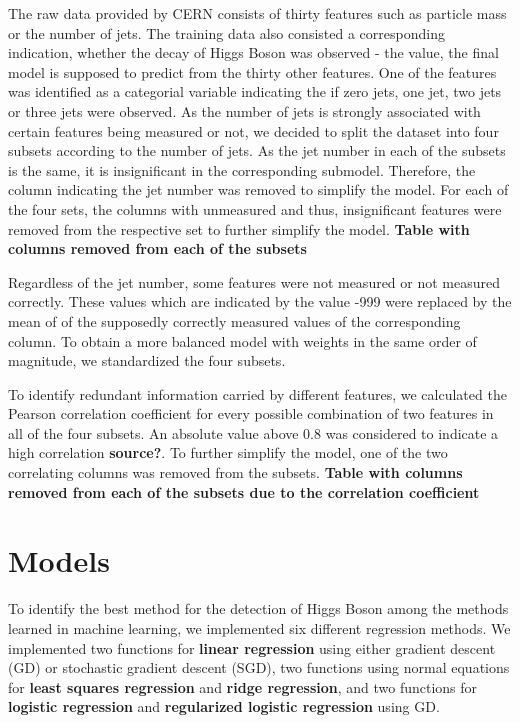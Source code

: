 \documentclass[10pt,conference,compsocconf]{IEEEtran}
\begin{document}
The raw data provided by CERN consists of thirty features such as particle mass or the number of jets. The training data also consisted a corresponding indication, whether the decay of Higgs Boson was observed - the value, the final model is supposed to predict from the thirty other features. One of the features was identified as a categorial variable indicating the if zero jets, one jet, two jets or three jets were observed. As the number of jets is strongly associated with certain features being measured or not, we decided to split the dataset into four subsets according to the number of jets. As the jet number in each of the subsets is the same, it is insignificant in the corresponding submodel. Therefore, the column indicating the jet number was removed to simplify the model. For each of the four sets, the columns with unmeasured and thus, insignificant features were removed from the respective set to further simplify the model.
\textbf{Table with columns removed from each of the subsets}

Regardless of the jet number, some features were not measured or not measured correctly. These values which are indicated by the value -999 were replaced by the mean of of the supposedly correctly measured values of the corresponding column. To obtain a more balanced model with weights in the same order of magnitude, we standardized the four subsets. 

To identify redundant information carried by different features, we calculated the Pearson correlation coefficient for every possible combination of two features in all of the four subsets. An absolute value above 0.8 was considered to indicate a high correlation \textbf{source?}. To further simplify the model, one of the two correlating columns was removed from the subsets. 
\textbf{Table with columns removed from each of the subsets due to the correlation coefficient}


\section{Models}
\label{sec:models}

To identify the best method for the detection of Higgs Boson among the methods learned in machine learning, we implemented six different regression methods. We implemented two functions for \textbf{linear regression} using either gradient descent (GD) or stochastic gradient descent (SGD), two functions using normal equations for \textbf{least squares regression} and \textbf{ridge regression}, and two functions for \textbf{logistic regression} and \textbf{regularized logistic regression} using GD.
\end{document}
